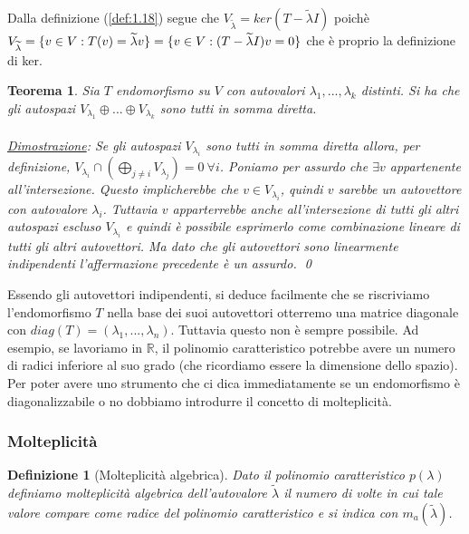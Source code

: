 \documentclass[a4paper,12pt]{report}
\newtheorem{teorema}{Teorema}[chapter]
\newtheorem{definizione}{Definizione}[chapter]
\begin{document}
Dalla definizione (\ref{def:1.18}) segue che $V_{\widetilde\lambda}=ker(T-\widetilde\lambda I)$ poichè $V_{\widetilde\lambda}=\{v \in V: T(v)=\widetilde\lambda v\}\\=\{v \in V:(T-\widetilde\lambda I)v=0\}$ che è proprio la definizione di ker.

\begin{teorema}
    Sia $T$ endomorfismo su $V$ con autovalori $\lambda _1,...,\lambda _k$ distinti. Si ha che gli autospazi $V_{\lambda _1}\oplus ...\oplus V_{\lambda _k}$ sono tutti in somma diretta.
    \\
    \\ \underline{Dimostrazione}: Se gli autospazi $V_{\lambda _i}$ sono tutti in somma diretta allora, per definizione, $V_{\lambda _i} \cap \left( \displaystyle\bigoplus_{j\neq i}V_{\lambda _j} \right)=0 \ \forall i $. Poniamo per assurdo che $\exists v$ appartenente all'intersezione. Questo implicherebbe che $v \in V_{\lambda _i}$, quindi $v$ sarebbe un autovettore con autovalore $\lambda _i$. Tuttavia $v$ apparterrebbe anche all'intersezione di tutti gli altri autospazi escluso $V_{\lambda _i}$ e quindi è possibile esprimerlo come combinazione lineare di tutti gli altri autovettori. Ma dato che gli autovettori sono linearmente indipendenti l'affermazione precedente è un assurdo. \qed
\end{teorema}

\newpage

Essendo gli autovettori indipendenti, si deduce facilmente che se riscriviamo l'endomorfismo $T$ nella base dei suoi autovettori otterremo una matrice diagonale con $diag(T)=(\lambda_1,...,\lambda_n)$. Tuttavia questo non è sempre possibile. Ad esempio, se lavoriamo in  $\mathbb{R}$, il polinomio caratteristico potrebbe avere un numero di radici inferiore al suo grado (che ricordiamo essere la dimensione dello spazio). Per poter avere uno strumento che ci dica immediatamente se un endomorfismo è diagonalizzabile o no dobbiamo introdurre il concetto di molteplicità.

\subsubsection{Molteplicità}

\begin{definizione}[Molteplicità algebrica]
    Dato il polinomio caratteristico $p(\lambda)$ definiamo molteplicità algebrica dell'autovalore $\widetilde\lambda$ il numero di volte in cui tale valore compare come radice del polinomio caratteristico e si indica con $m_a(\widetilde\lambda)$.
\end{definizione}
\end{document}
